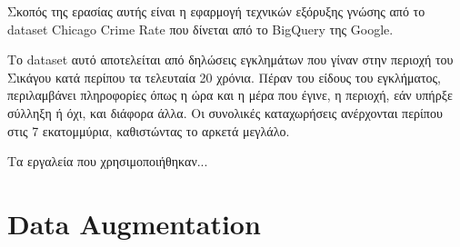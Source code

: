 \documentclass{article}
\begin{document}
Σκοπός της ερασίας αυτής είναι η εφαρμογή τεχνικών εξόρυξης γνώσης από το dataset Chicago Crime Rate που δίνεται από το BigQuery της Google.

Το dataset αυτό αποτελείται από δηλώσεις εγκλημάτων που γίναν στην περιοχή του Σικάγου κατά περίπου τα τελευταία 20 χρόνια. Πέραν του είδους του εγκλήματος, περιλαμβάνει πληροφορίες όπως η ώρα και η μέρα που έγινε, η περιοχή, εάν υπήρξε σύλληξη ή όχι, και διάφορα άλλα. Οι συνολικές καταχωρήσεις ανέρχονται περίπου στις 7 εκατομμύρια, καθιστώντας το αρκετά μεγλάλο.

Τα εργαλεία που χρησιμοποιήθηκαν...

\section{Data Augmentation}

\enddocument 
 
\end{document}

